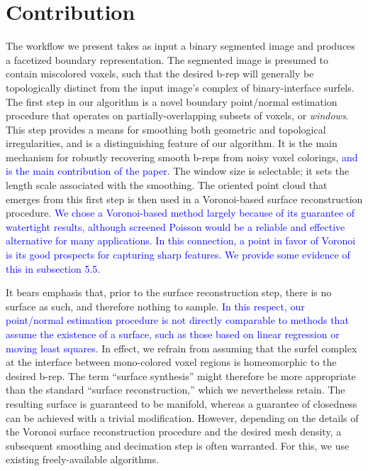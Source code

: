 \section{Contribution}
\label{sec:Contribution}

The workflow we present takes as input a binary segmented image and produces a facetized boundary representation.  The segmented image is presumed to contain miscolored voxels, such that the desired b-rep will generally be topologically distinct from the input image's complex of binary-interface surfels.  The first step in our algorithm is a novel boundary point/normal estimation procedure that operates on partially-overlapping subsets of voxels, or {\em windows}.  This step provides a means for smoothing both geometric and topological irregularities, and is a distinguishing feature of our algorithm.  It is the main mechanism for robustly recovering smooth b-reps from noisy voxel colorings, \textcolor{blue}{and is the main contribution of the paper}.  The window size is selectable; it sets the length scale associated with the smoothing.  The oriented point cloud that emerges from this first step is then used in a Voronoi-based surface reconstruction procedure.  \textcolor{blue}{We chose a Voronoi-based method largely because of its guarantee of watertight results, although screened Poisson would be a reliable and effective alternative for many applications.  In this connection, a point in favor of Voronoi is its good prospects for capturing sharp features.  We provide some evidence of this in subsection 5.5.}  

It bears emphasis that, prior to the surface reconstruction step, there is no surface as such, and therefore nothing to sample.  \textcolor{blue}{In this respect, our point/normal estimation procedure is not directly comparable to methods that assume the existence of a surface, such as those based on linear regression or moving least squares.}  In effect, we refrain from assuming that the surfel complex at the interface between mono-colored voxel regions is homeomorphic to the desired b-rep.  The term ``surface synthesis'' might therefore be more appropriate than the standard ``surface reconstruction,'' which we nevertheless retain. The resulting surface is guaranteed to be manifold, whereas a guarantee of closedness can be achieved with a trivial modification.  However, depending on the details of the Voronoi surface reconstruction procedure and the desired mesh density, a subsequent smoothing and decimation step is often warranted.  For this, we use existing freely-available algorithms.


